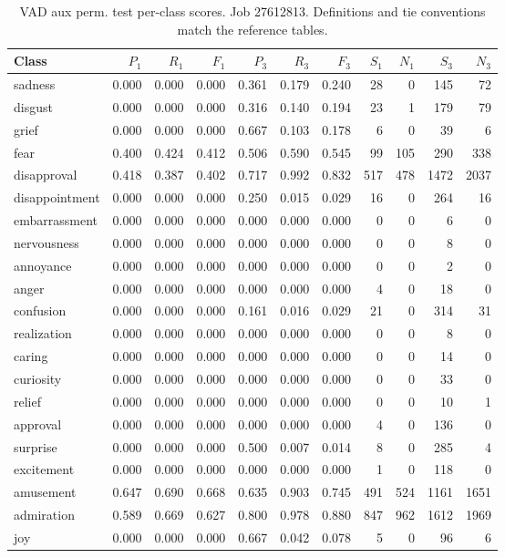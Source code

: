 \begin{table}[!htbp]
\centering
\scriptsize
\setlength{\tabcolsep}{5pt}
\begin{tabular}{lrrrrrrrrrr}
\toprule
Class & $P_1$ & $R_1$ & $F_1$ & $P_3$ & $R_3$ & $F_3$ & $S_1$ & $N_1$ & $S_3$ & $N_3$ \\
\midrule
sadness & 0.000 & 0.000 & 0.000 & 0.361 & 0.179 & 0.240 & 28 & 0 & 145 & 72 \\
disgust & 0.000 & 0.000 & 0.000 & 0.316 & 0.140 & 0.194 & 23 & 1 & 179 & 79 \\
grief & 0.000 & 0.000 & 0.000 & 0.667 & 0.103 & 0.178 & 6 & 0 & 39 & 6 \\
fear & 0.400 & 0.424 & 0.412 & 0.506 & 0.590 & 0.545 & 99 & 105 & 290 & 338 \\
disapproval & 0.418 & 0.387 & 0.402 & 0.717 & 0.992 & 0.832 & 517 & 478 & 1472 & 2037 \\
disappointment & 0.000 & 0.000 & 0.000 & 0.250 & 0.015 & 0.029 & 16 & 0 & 264 & 16 \\
embarrassment & 0.000 & 0.000 & 0.000 & 0.000 & 0.000 & 0.000 & 0 & 0 & 6 & 0 \\
nervousness & 0.000 & 0.000 & 0.000 & 0.000 & 0.000 & 0.000 & 0 & 0 & 8 & 0 \\
annoyance & 0.000 & 0.000 & 0.000 & 0.000 & 0.000 & 0.000 & 0 & 0 & 2 & 0 \\
anger & 0.000 & 0.000 & 0.000 & 0.000 & 0.000 & 0.000 & 4 & 0 & 18 & 0 \\
confusion & 0.000 & 0.000 & 0.000 & 0.161 & 0.016 & 0.029 & 21 & 0 & 314 & 31 \\
realization & 0.000 & 0.000 & 0.000 & 0.000 & 0.000 & 0.000 & 0 & 0 & 8 & 0 \\
caring & 0.000 & 0.000 & 0.000 & 0.000 & 0.000 & 0.000 & 0 & 0 & 14 & 0 \\
curiosity & 0.000 & 0.000 & 0.000 & 0.000 & 0.000 & 0.000 & 0 & 0 & 33 & 0 \\
relief & 0.000 & 0.000 & 0.000 & 0.000 & 0.000 & 0.000 & 0 & 0 & 10 & 1 \\
approval & 0.000 & 0.000 & 0.000 & 0.000 & 0.000 & 0.000 & 4 & 0 & 136 & 0 \\
surprise & 0.000 & 0.000 & 0.000 & 0.500 & 0.007 & 0.014 & 8 & 0 & 285 & 4 \\
excitement & 0.000 & 0.000 & 0.000 & 0.000 & 0.000 & 0.000 & 1 & 0 & 118 & 0 \\
amusement & 0.647 & 0.690 & 0.668 & 0.635 & 0.903 & 0.745 & 491 & 524 & 1161 & 1651 \\
admiration & 0.589 & 0.669 & 0.627 & 0.800 & 0.978 & 0.880 & 847 & 962 & 1612 & 1969 \\
joy & 0.000 & 0.000 & 0.000 & 0.667 & 0.042 & 0.078 & 5 & 0 & 96 & 6 \\
\bottomrule
\end{tabular}
\caption{VAD aux perm. test per-class scores. Job 27612813. Definitions and tie conventions match the reference tables.}
\label{tab:classes-b_vad_aux_permuted}
\end{table}
